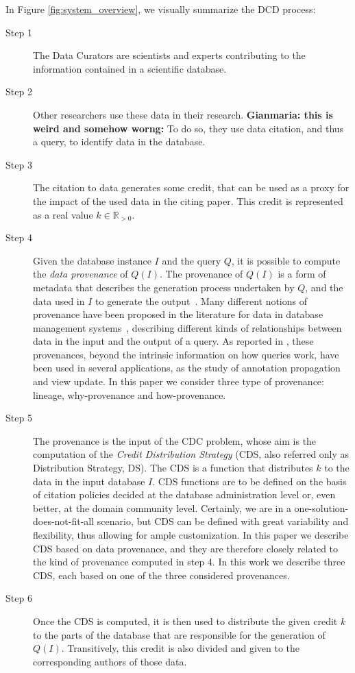 In Figure \ref{fig:system_overview}, we visually summarize the DCD process:
\begin{description}
	\item[Step 1] The Data Curators are scientists and experts contributing to the information contained in a scientific database. 
	\item[Step 2] Other researchers use these data in their research. \textbf{Gianmaria: this is weird and somehow worng: }To do so, they use data citation, and thus a query, to identify data in the database.
	\item[Step 3] The citation to data generates some credit, that can be used as a proxy for the impact of the used data in the citing paper. This credit is represented as a real value $k \in \mathbb{R}_{>0}$. %
	\item[Step 4] Given the database instance $I$ and the query $Q$, it is possible to compute the \emph{data provenance} of $Q(I)$. The provenance of $Q(I)$ is a form of metadata that describes the generation process undertaken by $Q$, and the data used in $I$ to generate the output~\citep{CheneyProvSurvey}. Many different notions of provenance have been proposed in the literature for data in database management systems~\citep{lineageCui, WhyProvBuneman, howProvenanceGreen, dosso2020prov}, describing different kinds of relationships between data in the input and the output of a query. As reported in \citep{CheneyProvSurvey}, these provenances, beyond the intrinsic information on how queries work, have been used in several applications, as the study of annotation propagation and view update. In this paper we consider three type of provenance: lineage, why-provenance and how-provenance.
	\item[Step 5] The provenance is the input of the CDC problem, whose aim is the computation of the \emph{Credit Distribution Strategy} (CDS, also referred only as Distribution Strategy, DS). The CDS is a function that distributes $k$ to the data in the input database $I$. 
	CDS functions are to be defined on the basis of citation policies decided at the database administration level or, even better, at the domain community level. 
	Certainly, we are in a one-solution-does-not-fit-all scenario, but CDS can be defined with great variability and flexibility, thus allowing for ample customization. 
	In this paper we describe CDS based on data provenance, and they are therefore closely related to the kind of provenance computed in step 4. In this work we describe three CDS, each based on one of the three considered provenances.
	\item[Step 6] Once the CDS is computed, it is then used to distribute the given credit $k$ to the parts of the database that are responsible for the generation of $Q(I)$. Transitively, this credit is also divided and given to the corresponding authors of those data.
\end{description}

